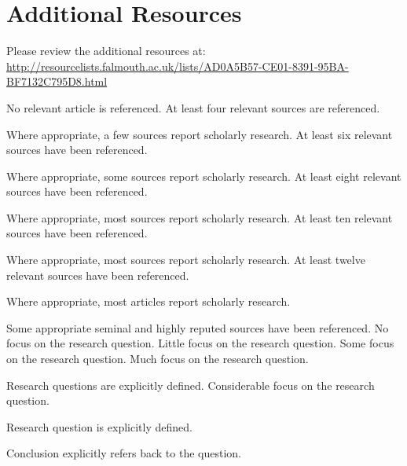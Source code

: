 \documentclass{../../fal_assignment}
\begin{document}
\section*{Additional Resources}

Please review the additional resources at: \url{http://resourcelists.falmouth.ac.uk/lists/AD0A5B57-CE01-8391-95BA-BF7132C795D8.html}

\begin{markingrubric}
%
%
        \grade\fail 	No relevant article is referenced.
        \grade 		At least four relevant sources are referenced.
        \par		Where appropriate, a few sources report scholarly research.
        \grade 		At least six relevant sources have been referenced.
        \par		Where appropriate, some sources report scholarly research.
        \grade 		At least eight relevant sources have been referenced.
        \par		Where appropriate, most sources report scholarly research.
        \grade 		At least ten relevant sources have been referenced.
        \par		Where appropriate, most sources report scholarly research.
        \grade 		At least twelve relevant sources have been referenced.
        \par		Where appropriate, most articles report scholarly research.
        \par		Some appropriate seminal and highly reputed sources have been referenced.       
%
        \grade\fail 	No focus on the research question.
        \grade 		Little focus on the research question.
        \grade 		Some focus on the research question.
        \grade 		Much focus on the research question.
            \par 		Research questions are explicitly defined.
        \grade 		Considerable focus on the research question.
            \par 		Research question is explicitly defined.
            \par 		Conclusion explicitly refers back to the question.

\end{markingrubric}
\end{document}
